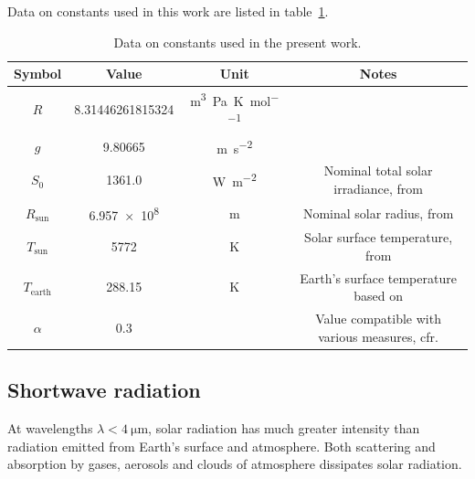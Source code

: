 \documentclass[a4paper,10pt,final,twocolumn]{article}
\begin{document}
Data on constants used in this work are listed in table~\ref{tab:constants}.
\begin{table}[h]
  \centering
  \caption{Data on constants used in the present work.}
  \label{tab:constants}
  \begin{tabular}[b]{cccc}
    \toprule
    Symbol           & Value                  & Unit                                           & Notes                                                      \\
    \midrule
    $R$              & \num{8.31446261815324} & \unit{\cubic\metre\pascal\per\kelvin\per\mole} &                                                            \\
    $g$              & \num{9.80665}          & \unit{\metre\per\square\second}                &                                                            \\
    $S_0$            & \num{1361.0}           & \unit{\watt\per\square\metre}                  & Nominal total solar irradiance, from \cite{IAU}            \\
    $R_\text{sun}$   & \num{6.957e8}          & \unit{\metre}                                  & Nominal solar radius, from \cite{IAU}                      \\
    $T_\text{sun}$   & \num{5772}             & \unit{\kelvin}                                 & Solar surface temperature, from \cite{IAU}                 \\
    $T_\text{earth}$ & \num{288.15}           & \unit{\kelvin}                                 & Earth's surface temperature based on \cite{ISA}            \\
    $\alpha$         & \num{0.3}              &                                                & Value compatible with various measures, cfr. \cite[1281]{albedo} \\
    \bottomrule
  \end{tabular}
\end{table}



\subsection{Shortwave radiation}
At wavelengths $\lambda < \qty{4}{\micro\metre}$, solar radiation has much greater intensity than radiation emitted from Earth's surface and atmosphere. Both scattering and absorption by gases, aerosols and clouds of atmosphere dissipates solar radiation.\cite[469]{ramanathan}
\end{document}
